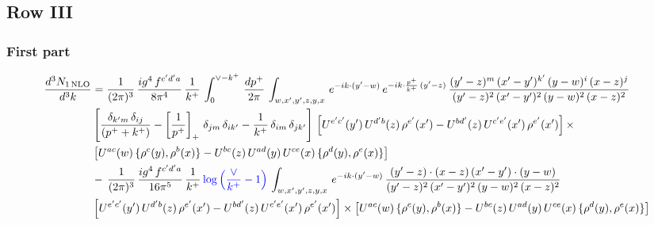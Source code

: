 \documentclass[9pt]{article}
\numberwithin{equation}{section}
\begin{document}
 \subsection{Row III}
 \subsubsection{First part}
 \begin{align}
     \frac{d^{3}N_{1\,\rm NLO}}{d^{3}k} & = \frac{1}{(2\pi)^{3}}\, \frac{ig^{4}\,f^{c'd'a}}{8\pi^{4}}\, \frac{1}{k^{+}}\,\int_{0}^{\vee-k^{+}}\,  \frac{dp^{+}}{2\pi}\, \int_{w,x',y',z,y,x}\, e^{-ik\cdot (y'-w)}\, e^{-ik\cdot \frac{p^{+}}{k^{+}}\,(y'-z)}\,\frac{(y'-z)^{m}\,(x'-y')^{k'}\,(y-w)^{i}\,(x-z)^{j}}{(y'-z)^{2}\,(x'-y')^{2}\,(y-w)^{2}\,(x-z)^{2}}\notag \\ & \left[\frac{\delta_{k'm}\,\delta_{ij}}{(p^{+}+k^{+})}-\left[\frac{1}{p^{+}}\right]_{+}\,\delta_{jm}\,\delta_{ik'}-\frac{1}{k^{+}}\, \delta_{im}\, \delta_{jk'}\right]\, \left[U^{e'c'}(y')\,U^{d'b}(z)\,\rho^{e'}(x')-U^{bd'}(z)\,U^{c'e'}(x')\,\rho^{e'}(x')\right]\times\notag \\ &  \left[U^{ac}(w)\, \{\rho^{c}(y),\rho^{b}(x)\}-U^{bc}(z)\,U^{ad}(y)\,U^{ce}(x)\,\{\rho^{d}(y),\rho^{e}(x)\}\right]\notag \\ & -\,\frac{1}{(2\pi)^{3}}\, \frac{ig^{4}\,f^{c'd'a}}{16\pi^{5}}\, \frac{1}{k^{+}}\,{\color{blue}\log{\left(\frac{\vee}{k^{+}}-1\right)}}\, \int_{w,x',y',z,y,x}\, e^{-ik\cdot (y'-w)}\,\frac{(y'-z)\cdot (x-z)\,(x'-y')\cdot (y-w)}{(y'-z)^{2}\,(x'-y')^{2}\,(y-w)^{2}\,(x-z)^{2}}\notag \\ &  \left[U^{e'c'}(y')\,U^{d'b}(z)\,\rho^{e'}(x')-U^{bd'}(z)\,U^{c'e'}(x')\,\rho^{e'}(x')\right]\times  \left[U^{ac}(w)\, \{\rho^{c}(y),\rho^{b}(x)\}-U^{bc}(z)\,U^{ad}(y)\,U^{ce}(x)\,\{\rho^{d}(y),\rho^{e}(x)\}\right]
\end{align} 
\end{document}
